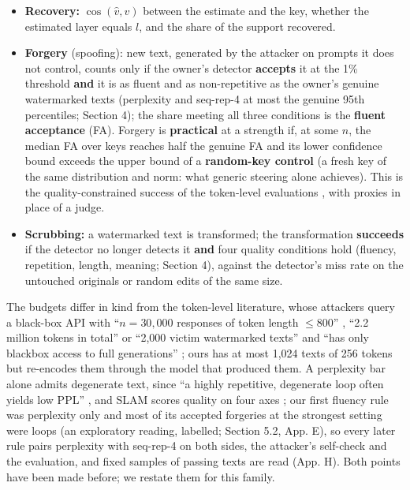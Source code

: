 \documentclass[11pt,letterpaper]{article}
\providecommand{\tightlist}{\setlength{\itemsep}{0pt}\setlength{\parskip}{0pt}}
\begin{document}
\begin{itemize}
\tightlist
\item
  \textbf{Recovery:} \(\cos(\hat v, v)\) between the estimate and the key, whether the estimated layer equals \(l\), and the share of the support recovered.
\item
  \textbf{Forgery} (spoofing): new text, generated by the attacker on prompts it does not control, counts only if the owner's detector \textbf{accepts} it at the 1\% threshold \textbf{and} it is as fluent and as non-repetitive as the owner's genuine watermarked texts (perplexity and seq-rep-4 \citep{welleck2020unlikelihood} at most the genuine 95th percentiles; Section 4); the share meeting all three conditions is the \textbf{fluent acceptance} (FA). Forgery is \textbf{practical} at a strength if, at some \(n\), the median FA over keys reaches half the genuine FA and its lower confidence bound exceeds the upper bound of a \textbf{random-key control} (a fresh key of the same distribution and norm: what generic steering alone achieves). This is the quality-constrained success of the token-level evaluations \citep{li2026marksec}, with proxies in place of a judge.
\item
  \textbf{Scrubbing:} a watermarked text is transformed; the transformation \textbf{succeeds} if the detector no longer detects it \textbf{and} four quality conditions hold (fluency, repetition, length, meaning; Section 4), against the detector's miss rate on the untouched originals or random edits of the same size.
\end{itemize}

The budgets differ in kind from the token-level literature, whose attackers query a black-box API with ``\(n = 30{,}000\) responses of token length \(\leq 800\)'' \citep[p.~6]{jovanovic2024stealing}, ``2.2 million tokens in total'' \citep[p.~6]{pang2024nofreelunch} or ``2,000 victim watermarked texts'' \citep[p.~8]{zhang2026beyondseal} and ``has only blackbox access to full generations'' \citep[p.~3]{jovanovic2024stealing}; ours has at most 1,024 texts of 256 tokens but re-encodes them through the model that produced them. A perplexity bar alone admits degenerate text, since ``a highly repetitive, degenerate loop often yields low PPL'' \citep[p.~14]{ardoin2026selfrecognition}, and SLAM scores quality on four axes \citep{harelcanada2026slam}; our first fluency rule was perplexity only and most of its accepted forgeries at the strongest setting were loops (an exploratory reading, labelled; Section 5.2, App. E), so every later rule pairs perplexity with seq-rep-4 on both sides, the attacker's self-check and the evaluation, and fixed samples of passing texts are read (App. H). Both points have been made before; we restate them for this family.
\end{document}
